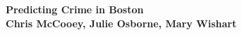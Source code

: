 \documentclass[a0,landscape]{a0poster}
\newcommand{\1}{\bold{1}}
\begin{document}




 


\begin{minipage}[b]{1.5\linewidth}
\begin{vwcol}[widths={0.35,0.65},sep=.8cm, justify=flush,rule=0pt,indent=1em]
\Huge \color{NavyBlue} \textbf{Predicting Crime in Boston} \color{Black}\\ %
\huge \color{Black}\textbf{Chris McCooey, Julie Osborne, Mary Wishart}    
\vfill\null


\end{vwcol}
      
\end{minipage}
%
%
\end{document}
